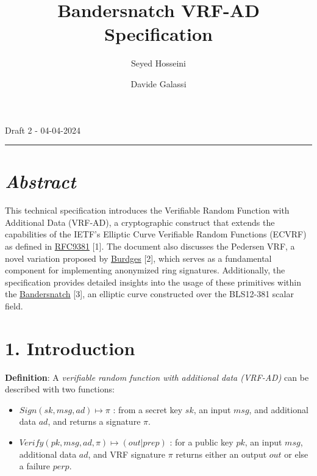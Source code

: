 \documentclass[
]{article}
\title{Bandersnatch VRF-AD Specification}
\author{Seyed Hosseini \and Davide Galassi}
\date{}
\providecommand{\tightlist}{%
  \setlength{\itemsep}{0pt}\setlength{\parskip}{0pt}}
\begin{document}
\maketitle

Draft 2 - 04-04-2024

\newcommand{\G}{\langle G \rangle}
\newcommand{\F}{\mathbb{Z}^*_r}

\begin{center}\rule{0.5\linewidth}{0.5pt}\end{center}

\hypertarget{abstract}{%
\section{\texorpdfstring{\emph{Abstract}}{Abstract}}\label{abstract}}

This technical specification introduces the Verifiable Random Function
with Additional Data (VRF-AD), a cryptographic construct that extends
the capabilities of the IETF's Elliptic Curve Verifiable Random
Functions (ECVRF) as defined in
\href{https://datatracker.ietf.org/doc/rfc9381}{RFC9381} {[}1{]}. The
document also discusses the Pedersen VRF, a novel variation proposed by
\href{https://eprint.iacr.org/2023/002}{Burdges} {[}2{]}, which serves
as a fundamental component for implementing anonymized ring signatures.
Additionally, the specification provides detailed insights into the
usage of these primitives within the
\href{https://eprint.iacr.org/2021/1152}{Bandersnatch} {[}3{]}, an
elliptic curve constructed over the BLS12-381 scalar field.

\hypertarget{introduction}{%
\section{1. Introduction}\label{introduction}}

\textbf{Definition}: A \emph{verifiable random function with additional
data (VRF-AD)} can be described with two functions:

\begin{itemize}
\tightlist
\item
  \(Sign(sk,msg,ad) \mapsto \pi\) : from a secret key \(sk\), an input
  \(msg\), and additional data \(ad\), and returns a signature \(\pi\).
\item
  \(Verify(pk,msg,ad,\pi) \mapsto (out|prep)\) : for a public key
  \(pk\), an input \(msg\), additional data \(ad\), and VRF signature
  \(\pi\) returns either an output \(out\) or else a failure \(perp\).
\end{itemize}
\end{document}
